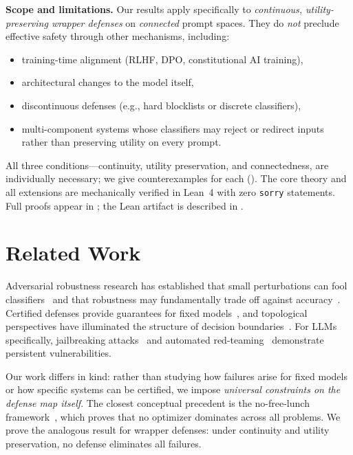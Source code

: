 \documentclass[11pt]{article}
\begin{document}
\medskip
\noindent\textbf{Scope and limitations.}
Our results apply specifically to \emph{continuous, utility-preserving
wrapper defenses} on \emph{connected} prompt spaces. They do \emph{not}
preclude effective safety through other mechanisms, including:
\begin{itemize}[nosep]
  \item training-time alignment (RLHF, DPO, constitutional AI training),
  \item architectural changes to the model itself,
  \item discontinuous defenses (e.g., hard blocklists or discrete classifiers),
  \item multi-component systems whose classifiers may reject or redirect
        inputs rather than preserving utility on every prompt.
\end{itemize}

All three conditions---continuity, utility preservation, and
connectedness, are individually necessary; we give counterexamples for
each (). The core theory and all extensions
are mechanically verified in Lean~4 with zero \texttt{sorry} statements.
Full proofs appear in ; the Lean artifact is described
in .


\section{Related Work}
\label{sec:related}

Adversarial robustness research has established that small
perturbations can fool classifiers~\cite{szegedy2013intriguing,
goodfellow2014explaining,carlini2017evaluating,madry2018towards} and
that robustness may fundamentally trade off against
accuracy~\cite{tsipras2018robustness,fawzi2018adversarial}. Certified
defenses provide guarantees for fixed
models~\cite{cohen2019certified,katz2017reluplex,singh2019abstract,
huang2017safety,bagnall2019certifying}, and topological perspectives
have illuminated the structure of decision
boundaries~\cite{naitzat2020topology}. For LLMs specifically,
jailbreaking attacks~\cite{zou2023universal,chao2024jailbreaking,
mehrotra2024tree,greshake2023indirect} and automated
red-teaming~\cite{mouret2015illuminating,samvelyan2024rainbow}
demonstrate persistent vulnerabilities.

Our work differs in kind: rather than studying how failures arise for
fixed models or how specific systems can be certified, we impose
\emph{universal constraints on the defense map itself}. The closest
conceptual precedent is the no-free-lunch
framework~\cite{wolpert1997no}, which proves that no optimizer
dominates across all problems. We prove the analogous result for
wrapper defenses: under continuity and utility preservation, no
defense eliminates all failures.
\end{document}
